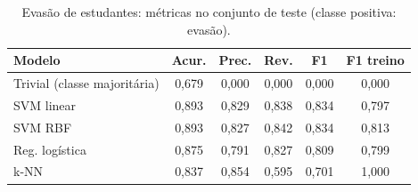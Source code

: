 \begin{table}[!t]
\centering
\caption{Evasão de estudantes: métricas no conjunto de teste (classe positiva: evasão).}
\label{tab:estudantes_metricas}
\begin{tabular}{lccccc}
\hline
Modelo & Acur. & Prec. & Rev. & F1 & F1 treino \\
\hline
Trivial (classe majoritária) & 0,679 & 0,000 & 0,000 & 0,000 & 0,000 \\
SVM linear & 0,893 & 0,829 & 0,838 & 0,834 & 0,797 \\
SVM RBF & 0,893 & 0,827 & 0,842 & 0,834 & 0,813 \\
Reg. logística & 0,875 & 0,791 & 0,827 & 0,809 & 0,799 \\
k-NN & 0,837 & 0,854 & 0,595 & 0,701 & 1,000 \\
\hline
\end{tabular}
\end{table}